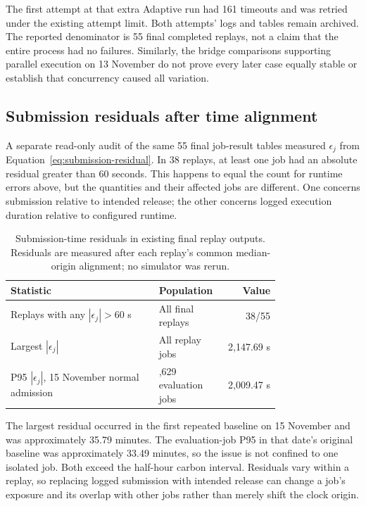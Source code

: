 The first attempt at that extra Adaptive run had 161 timeouts and was retried under the existing attempt limit. Both attempts' logs and tables remain archived. The reported denominator is 55 final completed replays, not a claim that the entire process had no failures. Similarly, the bridge comparisons supporting parallel execution on 13 November do not prove every later case equally stable or establish that concurrency caused all variation.

\subsection{Submission residuals after time alignment}\label{sec:submission-residual-audit}
A separate read-only audit of the same 55 final job-result tables measured $\epsilon_j$ from Equation~\ref{eq:submission-residual}. In 38 replays, at least one job had an absolute residual greater than 60 seconds. This happens to equal the count for runtime errors above, but the quantities and their affected jobs are different. One concerns submission relative to intended release; the other concerns logged execution duration relative to configured runtime.

\begin{table}[htbp]\centering\small
\caption{Submission-time residuals in existing final replay outputs. Residuals are measured after each replay's common median-origin alignment; no simulator was rerun.}\label{tab:submission-residual-audit}
\begin{tabular}{@{}>{\raggedright\arraybackslash}p{0.55\linewidth}>{\raggedright\arraybackslash}p{0.21\linewidth}r@{}}\toprule
Statistic & Population & Value\\\midrule
Replays with any $|\epsilon_j|>60$ s & All final replays & 38/55\\
Largest $|\epsilon_j|$ & All replay jobs & 2,147.69 s\\
P95 $|\epsilon_j|$, 15 November normal admission & 1,629 evaluation jobs & 2,009.47 s\\\bottomrule
\end{tabular}
\end{table}

The largest residual occurred in the first repeated baseline on 15 November and was approximately 35.79 minutes. The evaluation-job P95 in that date's original baseline was approximately 33.49 minutes, so the issue is not confined to one isolated job. Both exceed the half-hour carbon interval. Residuals vary within a replay, so replacing logged submission with intended release can change a job's exposure and its overlap with other jobs rather than merely shift the clock origin.

